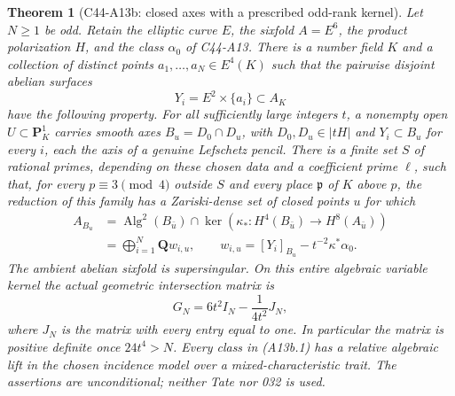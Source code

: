 \documentclass[11pt]{article}
\newtheorem{theorem}{Theorem}[section]
\theoremstyle{remark}\newtheorem{remark}[theorem]{Remark}
\DeclareMathOperator{\Alg}{Alg}
\begin{document}
\begin{theorem}[C44-A13b: closed axes with a prescribed odd-rank kernel]
Let $N\geq1$ be odd. Retain the elliptic curve $E$, the sixfold
$A=E^6$, the product polarization $H$, and the class $\alpha_0$
of C44-A13. There is a number field $K$ and a collection of
distinct points $a_1,\ldots,a_N\in E^4(K)$ such that the
pairwise disjoint abelian surfaces
\[
                     Y_i=E^2\times\{a_i\}\subset A_K
\]
have the following property. For all sufficiently large integers
$t$, a nonempty open $U\subset\mathbf P^1_K$ carries smooth axes
$B_u=D_0\cap D_u$, with $D_0,D_u\in|tH|$ and $Y_i\subset B_u$
for every $i$, each the axis of a genuine Lefschetz pencil.
There is a finite set $S$ of rational primes, depending on these
chosen data and a coefficient prime $\ell$, such that, for every
$p\equiv3\pmod4$ outside $S$ and every place $\mathfrak p$ of $K$
above $p$, the reduction of this family has a Zariski-dense set
of closed points $u$ for which
\[
 \begin{split}
 A_{B_u}
 &=\Alg^2(B_{\bar u})\cap\ker(\kappa_*:H^4(B_{\bar u})
                                      \longrightarrow H^8(A_{\bar u}))\\
 &=\bigoplus_{i=1}^N\mathbf Q w_{i,u},\qquad
 w_{i,u}=[Y_i]_{B_u}-t^{-2}\kappa^*\alpha_0.
 \end{split}
 \tag{A13b.1}
\]
The ambient abelian sixfold is supersingular. On this entire
algebraic variable kernel the actual geometric intersection
matrix is
\[
 G_N=6t^2 I_N-\frac1{4t^2}J_N,
 \tag{A13b.2}
\]
where $J_N$ is the matrix with every entry equal to one. In
particular the matrix is positive definite once $24t^4>N$.
Every class in (A13b.1) has a relative algebraic lift in the
chosen incidence model over a mixed-characteristic trait.
The assertions are unconditional; neither Tate nor 032 is used.
\end{theorem}
\end{document}
